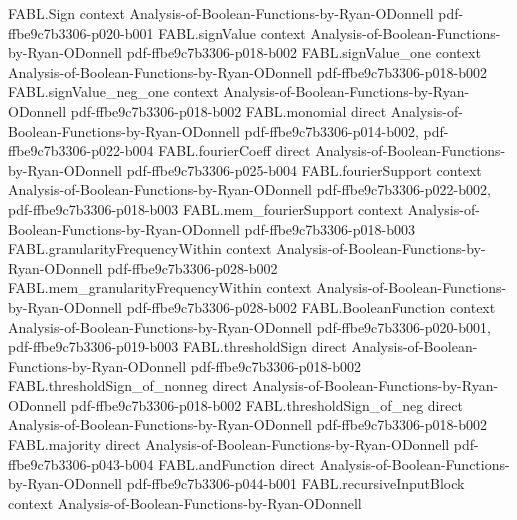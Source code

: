 \begin{theorem}
\label{FABL.andFunction_symmetric}
\leanok
{}
\proofstep
  {FABL.Sign}
  {context}
  {Analysis-of-Boolean-Functions-by-Ryan-ODonnell}
  {pdf-ffbe9c7b3306-p020-b001}
\proofstep
  {FABL.signValue}
  {context}
  {Analysis-of-Boolean-Functions-by-Ryan-ODonnell}
  {pdf-ffbe9c7b3306-p018-b002}
\proofstep
  {FABL.signValue_one}
  {context}
  {Analysis-of-Boolean-Functions-by-Ryan-ODonnell}
  {pdf-ffbe9c7b3306-p018-b002}
\proofstep
  {FABL.signValue_neg_one}
  {context}
  {Analysis-of-Boolean-Functions-by-Ryan-ODonnell}
  {pdf-ffbe9c7b3306-p018-b002}
\proofstep
  {FABL.monomial}
  {direct}
  {Analysis-of-Boolean-Functions-by-Ryan-ODonnell}
  {pdf-ffbe9c7b3306-p014-b002,
    pdf-ffbe9c7b3306-p022-b004}
\proofstep
  {FABL.fourierCoeff}
  {direct}
  {Analysis-of-Boolean-Functions-by-Ryan-ODonnell}
  {pdf-ffbe9c7b3306-p025-b004}
\proofstep
  {FABL.fourierSupport}
  {context}
  {Analysis-of-Boolean-Functions-by-Ryan-ODonnell}
  {pdf-ffbe9c7b3306-p022-b002,
    pdf-ffbe9c7b3306-p018-b003}
\proofstep
  {FABL.mem_fourierSupport}
  {context}
  {Analysis-of-Boolean-Functions-by-Ryan-ODonnell}
  {pdf-ffbe9c7b3306-p018-b003}
\proofstep
  {FABL.granularityFrequencyWithin}
  {context}
  {Analysis-of-Boolean-Functions-by-Ryan-ODonnell}
  {pdf-ffbe9c7b3306-p028-b002}
\proofstep
  {FABL.mem_granularityFrequencyWithin}
  {context}
  {Analysis-of-Boolean-Functions-by-Ryan-ODonnell}
  {pdf-ffbe9c7b3306-p028-b002}
\proofstep
  {FABL.BooleanFunction}
  {context}
  {Analysis-of-Boolean-Functions-by-Ryan-ODonnell}
  {pdf-ffbe9c7b3306-p020-b001,
    pdf-ffbe9c7b3306-p019-b003}
\proofstep
  {FABL.thresholdSign}
  {direct}
  {Analysis-of-Boolean-Functions-by-Ryan-ODonnell}
  {pdf-ffbe9c7b3306-p018-b002}
\proofstep
  {FABL.thresholdSign_of_nonneg}
  {direct}
  {Analysis-of-Boolean-Functions-by-Ryan-ODonnell}
  {pdf-ffbe9c7b3306-p018-b002}
\proofstep
  {FABL.thresholdSign_of_neg}
  {direct}
  {Analysis-of-Boolean-Functions-by-Ryan-ODonnell}
  {pdf-ffbe9c7b3306-p018-b002}
\proofstep
  {FABL.majority}
  {direct}
  {Analysis-of-Boolean-Functions-by-Ryan-ODonnell}
  {pdf-ffbe9c7b3306-p043-b004}
\proofstep
  {FABL.andFunction}
  {direct}
  {Analysis-of-Boolean-Functions-by-Ryan-ODonnell}
  {pdf-ffbe9c7b3306-p044-b001}
\proofstep
  {FABL.recursiveInputBlock}
  {context}
  {Analysis-of-Boolean-Functions-by-Ryan-ODonnell}

\end{theorem}
